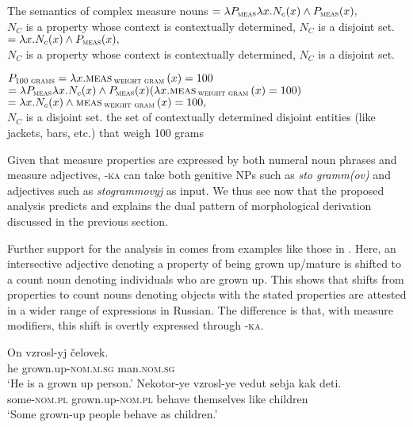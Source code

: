 \documentclass[output=paper,
colorlinks,
citecolor=brown,
newtxmath
]{langscibook}
\begin{document}
\ea\label{ex:17} The semantics of complex measure nouns
    \ea\label{ex:17a}  $= \lambda P_{\textsc{meas}} \lambda x.N_{c}(x) \wedge P_{\textsc{meas}}(x),$\\
    {\small $N_C$ is a property whose context is contextually determined, $N_C$ is a disjoint set.}
    \ex\label{ex:17b}  $= \lambda x. N_{c}(x) \wedge P_{\textsc{meas}}(x),$\\
    {\small $N_C$ is a property whose context is contextually determined, $N_C$ is a disjoint set.}
\z\z

\ea\label{ex:18}
    \ea\label{ex:18a} $P_{\textsc{100 grams}} = \lambda x. \textsc{meas}\,_{\textsc{weight gram}}\,(x) = 100$
    \ex\label{ex:18b}  $= \lambda P_{\textsc{meas}} \lambda x.N_{c}(x) \wedge P_{\textsc{meas}}(x) (\lambda x.\textsc{meas}\,_{\textsc{weight gram}}\,(x) = 100)$\\
            $= \lambda x.N_{c}(x) \wedge \textsc{meas}\,_{\textsc{weight gram}}\,(x) = 100,$\\
            \hspace{.7em} {\small $N_C$ is a disjoint set.}
    \z
    {\small the set of contextually determined disjoint entities (like jackets, bars, etc.) that weigh 100 grams}
\z

\noindent Given that measure properties are expressed by both numeral noun phrases and measure adjectives, \textsc{-ka} can take both genitive NPs such as \textit{sto gramm(ov)} and adjectives such as \textit{stogrammovyj} as input. We thus see now that the proposed analysis predicts and explains the dual pattern of morphological derivation discussed in the previous section.

Further support for the analysis in  comes from examples like those in . Here, an intersective adjective denoting a property of being grown up/\hspace{0pt}mature is shifted to a count noun denoting individuals who are grown up. This shows that shifts from properties to count nouns denoting objects with the stated properties are attested in a wider range of expressions in Russian. The difference is that, with measure modifiers, this shift is overtly expressed through \textsc{-ka}.

\ea\label{ex:19}
    \ea\label{ex:19a} \gll On vzrosl-yj čelovek.\\
    he grown.up-\textsc{nom.m.sg} man.\textsc{nom.sg}\\
    \glt `He is a grown up person.'
    \ex\label{ex:19b} \gll Nekotor-ye vzrosl-ye vedut sebja kak deti.\\
    some-\textsc{nom.pl} grown.up-\textsc{nom.pl} behave themselves like children\\
    \glt `Some grown-up people behave as children.'
\z\z
\end{document}
